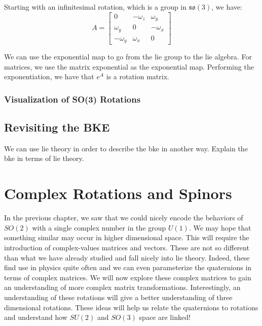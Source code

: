Starting with an infinitesimal rotation, which is a group in $\mathfrak{so}(3)$, we have:
$$A=\begin{bmatrix}
    0 &-\omega_z & \omega_y \\
    \omega_y & 0 & -\omega_x \\
    -\omega_y & \omega_x & 0
\end{bmatrix}$$

We can use the \gls{exponential map} to go from the \gls{lie group} to the \gls{lie algebra}. For matrices, we use the matrix exponential as the \gls{exponential map}. Performing the exponentiation, we have that $e^{A}$ is a rotation matrix.

\subsubsection{Visualization of SO(3) Rotations}


\subsection{Revisiting the BKE}
We can use \gls{lie theory} in order to describe the \gls{bke} in another way. 
Explain the \gls{bke} in terms of \gls{lie theory}.

\section{Complex Rotations and Spinors}
In the previous chapter, we saw that we could nicely encode the behaviors of $SO(2)$ with a single complex number in the group $U(1)$. We may hope that something similar may occur in higher dimensional space. This will require the introduction of complex-values matrices and vectors. These are not so different than what we have already studied and fall nicely into \gls{lie theory}. Indeed, these find use in physics quite often and we can even parameterize the quaternions in terms of complex matrices. We will now explore these complex matrices to gain an understanding of more complex matrix transformations. Interestingly, an understanding of these rotations will give a better understanding of three dimensional rotations. These ideas will help us relate the quaternions to rotations and understand how $SU(2)$ and $SO(3)$ space are linked!

